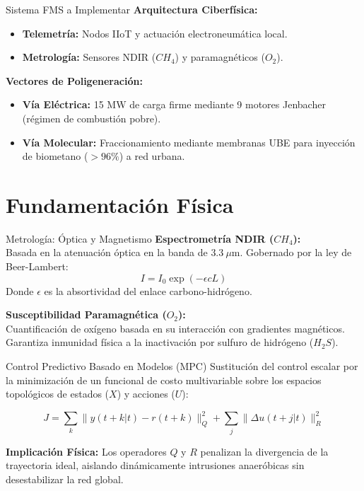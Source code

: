 \documentclass[aspectratio=169,sn-mathphys-num,spanish]{beamer}
\begin{document}
\begin{frame}{Sistema FMS a Implementar}
	\textbf{Arquitectura Ciberfísica:}
	\begin{itemize}
		\item \textbf{Telemetría:} Nodos IIoT y actuación electroneumática local.
		\item \textbf{Metrología:} Sensores NDIR ($CH_4$) y paramagnéticos ($O_2$).
	\end{itemize}

	\vspace{0.5cm}
	\textbf{Vectores de Poligeneración:}
	\begin{itemize}
		\item \textbf{Vía Eléctrica:} 15 MW de carga firme mediante 9 motores
			Jenbacher (régimen de combustión pobre).
		\item \textbf{Vía Molecular:} Fraccionamiento mediante membranas UBE
			para inyección de biometano ($>96\%$) a red urbana.
	\end{itemize}
\end{frame}

\section{Fundamentación Física}

\begin{frame}{Metrología: Óptica y Magnetismo}
	\textbf{Espectrometría NDIR ($CH_4$):} \\
	Basada en la atenuación óptica en la banda de $3.3~\mu\text{m}$. Gobernado
	por la ley de Beer-Lambert:
	$$I = I_{0} \exp(-\epsilon c L)$$
	Donde $\epsilon$ es la absortividad del enlace carbono-hidrógeno.

	\vspace{0.5cm}
	\textbf{Susceptibilidad Paramagnética ($O_2$):} \\
	Cuantificación de oxígeno basada en su interacción con gradientes
	magnéticos. Garantiza inmunidad física a la inactivación por sulfuro
	de hidrógeno ($H_2S$).
\end{frame}

\begin{frame}{Control Predictivo Basado en Modelos (MPC)}
	Sustitución del control escalar por la minimización de un funcional de costo
	multivariable sobre los espacios topológicos de estados ($X$) y acciones ($U$):

	$$ J = \sum_{k} \|y(t+k|t) - r(t+k)\|_{Q}^{2} + \sum_{j} \|\Delta u(t+j|t)\|_{R}^{2} $$

	\vspace{0.5cm}
	\textbf{Implicación Física:}
	Los operadores $Q$ y $R$ penalizan la divergencia de la trayectoria ideal,
	aislando dinámicamente intrusiones anaeróbicas sin desestabilizar la red
	global.
\end{frame}
\end{document}
